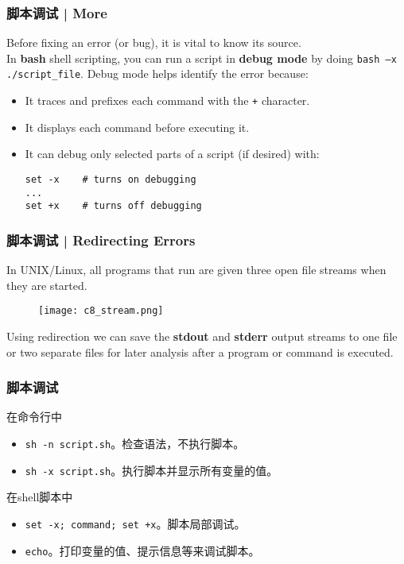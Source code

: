 \begin{frame}[fragile]
  \frametitle{脚本调试 | More}
  Before fixing an error (or bug), it is vital to know its source.\\
  \vspace{0.3cm}
  In \textbf{bash} shell scripting, you can run a script in \textbf{debug mode} by doing \verb|bash –x ./script_file|. Debug mode helps identify the error because:
  \begin{itemize}
    \item It traces and prefixes each command with the \verb|+| character.
    \item It displays each command before executing it.
    \item It can debug only selected parts of a script (if desired) with:\\
\begin{lstlisting}
set -x    # turns on debugging
...
set +x    # turns off debugging
\end{lstlisting}
  \end{itemize}
\end{frame}

\begin{frame}
  \frametitle{脚本调试 | Redirecting Errors}
  In UNIX/Linux, all programs that run are given three open file streams when they are started.
  \vspace{-0.3cm}
  \begin{figure}
    \centering
    \texttt{[image: c8\_stream.png]}
  \end{figure}
  \vspace{-0.3cm}
  Using redirection we can save the \textbf{stdout} and \textbf{stderr} output streams to one file or two separate files for later analysis after a program or command is executed.
\end{frame}


\begin{frame}[fragile]
  \frametitle{\alert{脚本调试}}
  \begin{block}{在命令行中}
  \begin{itemize}
    \item \verb|sh -n script.sh|。检查语法，不执行脚本。
    \item \verb|sh -x script.sh|。执行脚本并显示所有变量的值。
  \end{itemize}
\end{block}
\pause
  \begin{block}{在shell脚本中}
  \begin{itemize}
    \item \verb|set -x; command; set +x|。脚本局部调试。
    \item \verb|echo|。打印变量的值、提示信息等来调试脚本。
  \end{itemize}
\end{block}
\end{frame}


